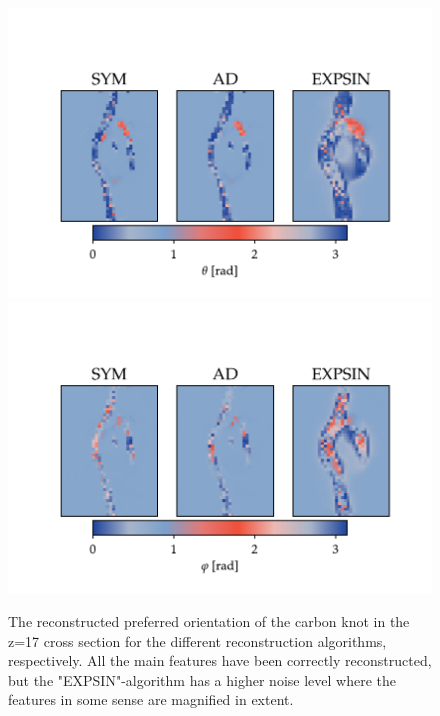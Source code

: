 \begin{figure}[h!]
    \centering

    \includegraphics[trim = {0 0 0 2.0cm}, clip, width = 1\textwidth]{./svg-inkscape/ck_slices_theta_svg-tex.pdf}
    \includegraphics[trim = {0 0 0 2.0cm}, clip, width = 1\textwidth]{./svg-inkscape/ck_slices_phi_svg-tex.pdf}
    \caption[Slice of Reconstructed Orientation for Carbon Knot]{  The reconstructed preferred orientation of the carbon knot in the z=17 cross section for the different reconstruction algorithms, respectively.
        All the main features have been correctly reconstructed, but the "EXPSIN"-algorithm has a higher noise level where the features in some sense are magnified in extent. }
    \label{fig:carbon_knot_reconstruction_2D_angles}
\end{figure}




